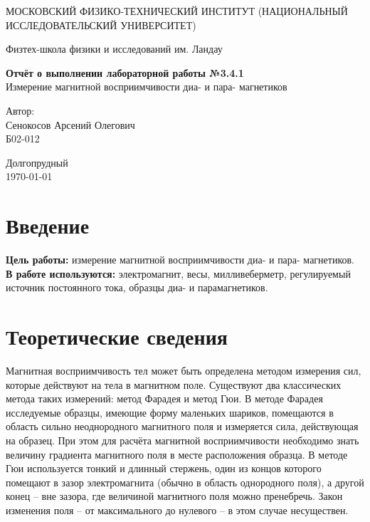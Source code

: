\documentclass[a4paper,12pt]{article} %
\date{\today}
\begin{document}
\begin{titlepage}
	\begin{center}
		{\large МОСКОВСКИЙ ФИЗИКО-ТЕХНИЧЕСКИЙ ИНСТИТУТ (НАЦИОНАЛЬНЫЙ ИССЛЕДОВАТЕЛЬСКИЙ УНИВЕРСИТЕТ)}
	\end{center}
	\begin{center}
		{\large Физтех-школа физики и исследований им. Ландау}
	\end{center}
	
	
	\vspace{4.5cm}
	{\huge
		\begin{center}
			{\bf Отчёт о выполнении лабораторной работы №3.4.1}\\
			Измерение магнитной восприимчивости диа- и пара- магнетиков
		\end{center}
	}
	\vspace{2cm}
	\begin{flushright}
		{\LARGE Автор:\\ Сенокосов Арсений Олегович \\
			\vspace{0.2cm}
			Б02-012}
	\end{flushright}
	\vspace{8cm}
	\begin{center}
		Долгопрудный\\
		\today
	\end{center}
\end{titlepage}

\section{Введение}

\textbf{Цель работы:} измерение магнитной восприимчивости диа- и пара- магнетиков.
\\
\textbf{В работе используются:} электромагнит, весы, милливеберметр, регулируемый источник постоянного тока, образцы диа- и парамагнетиков.

\section{Теоретические сведения}

Магнитная восприимчивость тел может быть определена методом измерения сил, которые действуют на тела в магнитном поле. Существуют два классических метода таких измерений: метод Фарадея и метод Гюи. В методе Фарадея исследуемые образцы, имеющие форму маленьких шариков, помещаются в область сильно неоднородного магнитного поля и измеряется сила, действующая на образец. При этом для расчёта магнитной восприимчивости необходимо знать величину градиента магнитного поля в месте расположения образца. В методе Гюи используется тонкий и длинный стержень, один из концов которого помещают в зазор электромагнита (обычно в область однородного поля), а другой конец -- вне зазора, где величиной магнитного поля можно пренебречь. Закон изменения поля -- от максимального до нулевого -- в этом случае несуществен.
\end{document}
